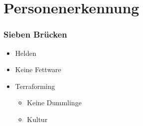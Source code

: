 \section{Personenerkennung}
%
\begin{frame}
	\frametitle{Sieben Brücken}
	\begin{itemize}
		\item Helden
		\item Keine Fettware
		\item Terraforming
		\begin{itemize}
			\item Keine Dummlinge
			\item Kultur
		\end{itemize}
	\end{itemize}
\end{frame}
